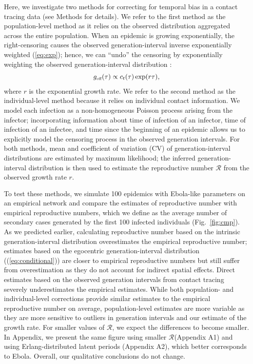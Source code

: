 \documentclass[12pt]{article}
\newcommand{\eref}[1]{(\ref{eq:#1})}
\newcommand{\fref}[1]{Fig.~\ref{fig:#1}}
\newcommand{\RR}{\ensuremath{{\mathcal R}}}
\newcommand{\tsub}[2]{#1_{{\textrm{\tiny #2}}}}
\begin{document}
Here, we investigate two methods for correcting for temporal bias in a contact tracing data (see Methods for details).
We refer to the first method as the population-level method as it relies on the observed distribution aggregated across the entire population.
When an epidemic is growing exponentially, the right-censoring causes the observed generation-interval inverse exponentially weighted \eref{exp}; hence, we can ``undo'' the censoring by exponentially weighting the observed generation-interval distribution \citep{tomba2010some, nishiura2010time, britton2019estimation}:
\begin{equation}
\tsub{g}{eff}(\tau) \propto c_t(\tau) \exp(r\tau),
\end{equation}
where $r$ is the exponential growth rate.
We refer to the second method as the individual-level method because it relies on individual contact information.
We model each infection as a non-homogeneous Poisson process arising from the infector; 
incorporating information about time of infection of an infector, time of infection of an infectee, and time since the beginning of an epidemic allows us to explicitly model the censoring process in the observed generation intervals.
For both methods, mean and coefficient of variation (CV) of generation-interval distributions are estimated by maximum likelihood; the inferred generation-interval distribution is then used to estimate the reproductive number $\RR$ from the observed growth rate $r$.

To test these methods, we simulate 100 epidemics with Ebola-like parameters on an empirical network \citep{leskovec2016snap} and compare the estimates of reproductive number with empirical reproductive numbers, which we define as the average number of secondary cases generated by the first 100 infected individuals (\fref{cmp}).
As we predicted earlier, calculating reproductive number based on the intrinsic generation-interval distribution overestimates the empirical reproductive number;
estimates based on the egocentric generation-interval distribution (\eref{conditional}) are closer to empirical reproductive numbers but still suffer from overestimation as they do not account for indirect spatial effects. Direct estimates based on the observed generation intervals from contact tracing severely underestimates the empirical estimates.
While both population- and individual-level corrections provide similar estimates to the empirical reproductive number on average,
population-level estimates are more variable as they are more sensitive to outliers in generation intervals and our estimate of the growth rate.
For smaller values of \RR, we expect the differences to become smaller.
In Appendix, we present the same figure using smaller \RR (Appendix A1) and using Erlang-distributed latent periods (Appendix A2), which better corresponds to Ebola.
Overall, our qualitative conclusions do not change.
\end{document}
